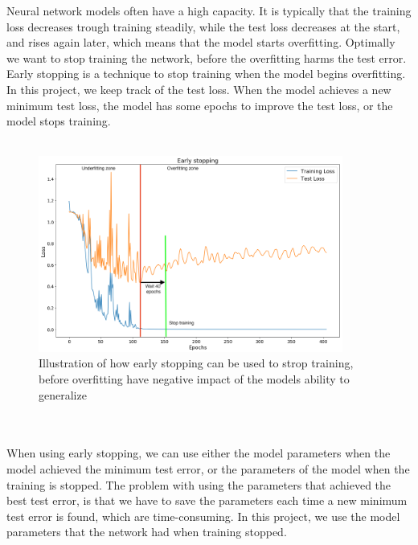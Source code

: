 \documentclass[11pt]{article}
\begin{document}
Neural network models often have a high capacity. It is typically that the training loss decreases trough training steadily, while the test loss decreases at the start, and rises again later, which means that the model starts overfitting. Optimally we want to stop training the network, before the overfitting harms the test error. Early stopping is a technique to stop training when the model begins overfitting. In this project, we keep track of the test loss. When the model achieves a new minimum test loss, the model has some epochs to improve the test loss, or the model stops training.
\\ \\
\begin{figure}[!h]
    \centering
    \includegraphics[width=10cm]{figurer/deep_learning/early_stopping.png}
    \caption{Illustration of how early stopping can be used to strop training, before overfitting have negative impact of the models ability to generalize}
    \label{fig:deep_learning_early_stopping}
\end{figure}
\\ \\
When using early stopping, we can use either the model parameters when the model achieved the minimum test error, or the parameters of the model when the training is stopped. The problem with using the parameters that achieved the best test error, is that we have to save the parameters each time a new minimum test error is found, which are time-consuming. In this project, we use the model parameters that the network had when training stopped.
\end{document}
